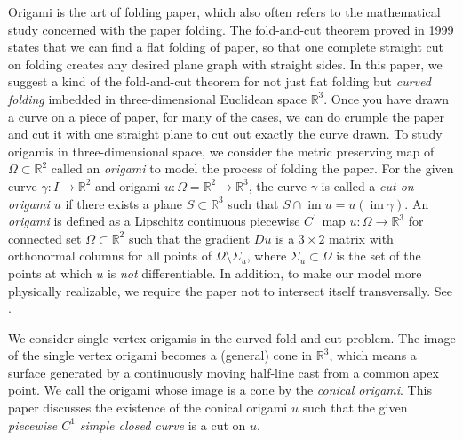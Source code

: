 \documentclass{amsart}
\theoremstyle{plain}
\theoremstyle{definition}
\theoremstyle{remark}
\DeclareMathOperator{\im}{im}
\begin{document}
Origami is the art of folding paper, which also often refers to the mathematical study concerned with the paper folding.
The fold-and-cut theorem proved in 1999 \cite{demaine2000folding} states that we can find a flat folding of paper, so that one complete straight cut on folding creates any desired plane graph with straight sides.
In this paper, we suggest a kind of the fold-and-cut theorem for not just flat folding but \emph{curved folding} imbedded in three-dimensional Euclidean space $\mathbb{R}^3$.
Once you have drawn a curve on a piece of paper, for many of the cases, we can do crumple the paper and cut it with one straight plane to cut out exactly the curve drawn.
To study origamis in three-dimensional space, we consider the metric preserving map of ${\Omega\subset\mathbb R}^2$ called an \emph{origami} to model the process of folding the paper.
For the given curve $\gamma:I\to\mathbb{R}^2$ and origami $u:\Omega=\mathbb{R}^2\to\mathbb{R}^3$, the curve $\gamma$ is called a \emph{cut on origami $u$} if there exists a plane $S\subset\mathbb{R}^3$ such that $S\cap\im u=u(\im\gamma)$.
An \emph{origami} is defined as a Lipschitz continuous piecewise $C^1$ map $u:\Omega\to\mathbb{R}^3$ for connected set $\Omega\subset\mathbb{R}^2$ such that the gradient $Du$ is a $3\times 2$ matrix with orthonormal columns for all points of $\Omega\setminus\Sigma_u$, where $\Sigma_u\subset\Omega$ is the set of the points at which $u$ is \emph{not} differentiable. 
In addition, to make our model more physically realizable, we require the paper not to intersect itself transversally.
See \cite{dacorogna2008lipschitz}.

We consider single vertex origamis in the curved fold-and-cut problem.
The image of the single vertex origami becomes a (general) cone in $\mathbb{R}^3$, which means a surface generated by a continuously moving half-line cast from a common apex point.
We call the origami whose image is a cone by the \emph{conical origami}.
This paper discusses the existence of the conical origami $u$ such that the given \emph{piecewise $C^1$ simple closed curve} is a cut on $u$.
\end{document}
